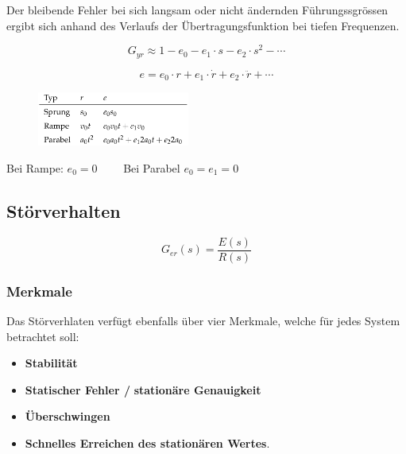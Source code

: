 \documentclass[
  10pt,
  a4paper,
  twocolumn]{article}
\providecommand{\tightlist}{%
  \setlength{\itemsep}{0pt}\setlength{\parskip}{0pt}}\usepackage{longtable,booktabs,array}
\numberwithin{equation}{section}
\begin{document}
Der bleibende Fehler bei sich langsam oder nicht ändernden
Führungssgrössen ergibt sich anhand des Verlaufs der
Übertragungsfunktion bei tiefen Frequenzen.

\[
G_{yr}\approx 1-e_0-e_1\cdot s-e_2\cdot s^2 - \cdots
\]

\[
e = e_0 \cdot r + e_1 \cdot \dot{r}+e_2\cdot \ddot{r}+\cdots
\]

\begin{figure}[H]

{\centering \includegraphics[width=5cm,height=1.8cm]{images/paste-37.png}

}

\end{figure}

\begin{tcolorbox}[enhanced jigsaw, colframe=quarto-callout-note-color-frame, toptitle=1mm, title=\textcolor{quarto-callout-note-color}{\faInfo}\hspace{0.5em}{Stationärer Fehler}, bottomtitle=1mm, opacityback=0, left=2mm, opacitybacktitle=0.6, bottomrule=.15mm, leftrule=.75mm, coltitle=black, titlerule=0mm, colback=white, breakable, toprule=.15mm, colbacktitle=quarto-callout-note-color!10!white, rightrule=.15mm, arc=.35mm]

Bei Rampe: \(e_0 = 0\qquad\) Bei Parabel \(e_0 = e_1 = 0\)

\end{tcolorbox}

\hypertarget{stuxf6rverhalten}{%
\subsection{Störverhalten}\label{stuxf6rverhalten}}

\[
G_{er}(s)=\frac{E(s)}{R(s)}
\]

\hypertarget{merkmale-1}{%
\subsubsection{Merkmale}\label{merkmale-1}}

Das Störverhlaten verfügt ebenfalls über vier Merkmale, welche für jedes
System betrachtet soll:

\begin{itemize}
\tightlist
\item
  \textbf{Stabilität}
\item
  \textbf{Statischer Fehler /} \textbf{stationäre Genauigkeit}
\item
  \textbf{Überschwingen}
\item
  \textbf{Schnelles Erreichen des stationären Wertes}.
\end{itemize}
\end{document}
